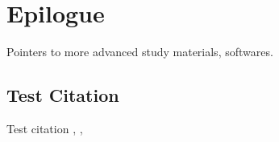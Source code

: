 \chapter{Epilogue}

Pointers to more advanced study materials, softwares.


\section{Test Citation}

Test citation \cite{MichaudRioux2016}, \cite{VanMourik2014},
\cite{Banerjee2016}
